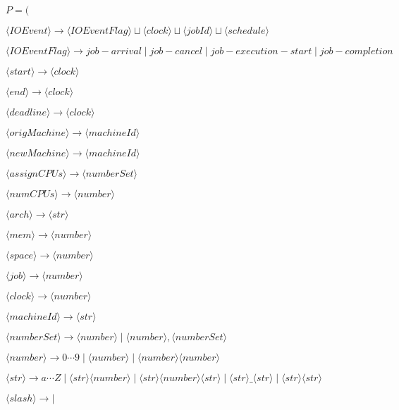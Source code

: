\documentclass[final]{fithesis}
\begin{document}
\begin{list}{}{$P = ($}
	\item $\langle IOEvent \rangle 
		\longrightarrow 
		\langle IOEventFlag \rangle \sqcup \langle clock \rangle \sqcup \langle jobId \rangle \sqcup \langle schedule \rangle$
	\item $\langle IOEventFlag \rangle 
		\longrightarrow 
		job-arrival \mid job-cancel \mid job-execution-start \mid job-completion$
	\item $\langle start \rangle 
		\longrightarrow 
		\langle clock \rangle$
	\item $\langle end \rangle 
		\longrightarrow 
		\langle clock \rangle$
	\item $\langle deadline \rangle 
		\longrightarrow 
		\langle clock \rangle$
	\item $\langle origMachine \rangle 
		\longrightarrow 
		\langle machineId \rangle$
	\item $\langle newMachine \rangle 
		\longrightarrow 
		\langle machineId \rangle$
	\item $\langle assignCPUs \rangle 
		\longrightarrow 
		\langle numberSet \rangle$
	\item $\langle numCPUs \rangle 
		\longrightarrow
		\langle number \rangle$
	\item $\langle arch \rangle 
		\longrightarrow 
		\langle str \rangle$
	\item $\langle mem \rangle 
		\longrightarrow 
		\langle number \rangle$
	\item $\langle space \rangle 
		\longrightarrow 
		\langle number \rangle$
	\item $\langle job \rangle 
		\longrightarrow 
		\langle number \rangle$
	\item $\langle clock \rangle 
		\longrightarrow 
		\langle number \rangle$
	\item $\langle machineId \rangle 
		\longrightarrow 
		\langle str \rangle$
	\item $\langle numberSet \rangle 
		\longrightarrow 
		\langle number \rangle \mid \langle number \rangle , \langle numberSet \rangle$
	\item $\langle number \rangle 
		\longrightarrow 
		0 \cdots 9 \mid \langle number \rangle \mid \langle number \rangle \langle number \rangle$
	\item $\langle str \rangle 
		\longrightarrow 
		a \cdots Z \mid \langle str \rangle \langle number \rangle \mid \langle str \rangle \langle number \rangle \langle str \rangle \mid \langle str \rangle \_ \langle str \rangle \mid \langle str \rangle \langle str \rangle$
	\item $\langle slash \rangle 
		\longrightarrow 
		|$
\end{list}
\end{document}

